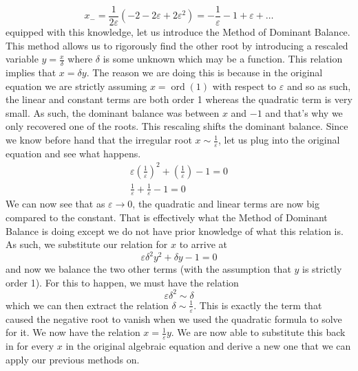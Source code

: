 \documentclass{article}
\begin{document}
\begin{equation*}
    x_{-} =\frac{1}{2\varepsilon}(-2-2\varepsilon+2\varepsilon^2) = -\frac{1}{\varepsilon}-1+\varepsilon+\ldots
\end{equation*}
equipped with this knowledge, let us introduce the Method of Dominant Balance. This method allows us to rigorously find the other root by introducing a rescaled variable $y=\frac{x}{\delta}$ where $\delta$ is some unknown which may be a function. This relation implies that $x=\delta y$. The reason we are doing this is because in the original equation we are strictly assuming $x=\operatorname{ord} (1)$ with respect to $\varepsilon$ and so as such, the linear and constant terms are both order 1 whereas the quadratic term is very small. As such, the dominant balance was between $x$ and $-1$ and that's why we only recovered one of the roots. This rescaling shifts the dominant balance. Since we know before hand that the irregular root $x\sim \frac{1}{\varepsilon}$, let us plug into the original equation and see what happens.
\begin{equation*}
    \begin{split}
        \varepsilon\left(\frac{1}{\varepsilon}\right)^2 + \left(\frac{1}{\varepsilon}\right) -1=0 \\
        \frac{1}{\varepsilon}+\frac{1}{\varepsilon}-1=0
    \end{split}
\end{equation*}
We can now see that as $\varepsilon \rightarrow 0$, the quadratic and linear terms are now big compared to the constant. That is effectively what the Method of Dominant Balance is doing except we do not have prior knowledge of what this relation is. As such, we substitute our relation for $x$ to arrive at 
\begin{equation*}
    \varepsilon \delta^2 y^2+\delta y-1=0
\end{equation*}
and now we balance the two other terms (with the assumption that $y$ is strictly order 1). For this to happen, we must have the relation 
\begin{equation*}
    \varepsilon \delta^2\sim\delta
\end{equation*}
which we can then extract the relation $\delta \sim \frac{1}{\varepsilon}$. This is exactly the term that caused the negative root to vanish when we used the quadratic formula to solve for it. We now have the relation $x=\frac{1}{\varepsilon}y$. We are now able to substitute this back in for every $x$ in the original algebraic equation and derive a new one that we can apply our previous methods on.
\end{document}
